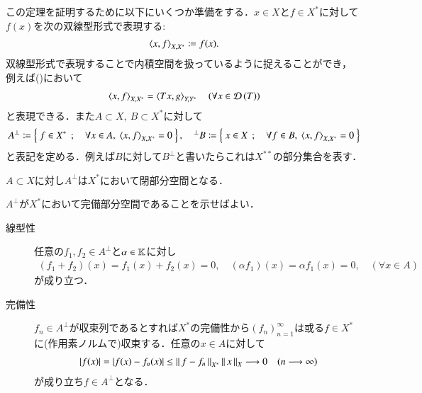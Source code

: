 	この定理を証明するために以下にいくつか準備をする．$x \in X$と$f \in X^*$に対して$f(x)$を次の双線型形式で表現する:
	\begin{align}
		\inprod<x,f>_{X,X^*} \coloneqq f(x).
	\end{align}
	双線型形式で表現することで内積空間を扱っているように捉えることができ，
	例えば()において
	\begin{align}
		\inprod<x,f>_{X,X^*} = \inprod<Tx,g>_{Y,Y^*} \quad (\forall x \in \Dom{T} )
	\end{align}
	と表現できる．また$A \subset X,\ B \subset X^*$に対して
	\begin{align}
		A^{\perp} \coloneqq \Set{f \in X^*}{\forall x \in A,\ \inprod<x,f>_{X,X^*} = 0}, \quad 
		{}^{\perp}B \coloneqq \Set{x \in X}{\forall f \in B,\ \inprod<x,f>_{X,X^*} = 0}
	\end{align}
	と表記を定める．例えば$B$に対して$B^{\perp}$と書いたらこれは$X^{**}$の部分集合を表す．
	
	\begin{screen}
		\begin{lem}
			$A \subset X$に対し$A^{\perp}$は$X^*$において閉部分空間となる．
			\label{lem:T_star_closed_1}
		\end{lem}
	\end{screen}
	
	\begin{prf}
		$A^{\perp}$が$X^*$において完備部分空間であることを示せばよい．
		\begin{description}
			\item[線型性]
				任意の$f_1,f_2 \in A^{\perp}$と$\alpha \in \mathbb{K}$に対し
				\begin{align}
					(f_1 + f_2)(x) = f_1(x) + f_2(x) = 0, \quad (\alpha f_1)(x) = \alpha f_1(x) = 0
					,\quad (\forall x \in A)
				\end{align}
				が成り立つ．
				
			\item[完備性]
				$f_n \in A^{\perp}$が収束列であるとすれば$X^*$の完備性から$(f_n)_{n=1}^{\infty}$は或る$f \in X^*$
				に(作用素ノルムで)収束する．任意の$x \in A$に対して
				\begin{align}
					|f(x)| = |f(x) - f_n(x)| \leq \left\|\, f-f_n\, \right\|_{X^*}\left\|\, x\, \right\|_{X} \longrightarrow 0 \quad (n \longrightarrow \infty)
				\end{align}
				が成り立ち$f \in A^{\perp}$となる．
		\end{description}
		\QED
	\end{prf}
	
